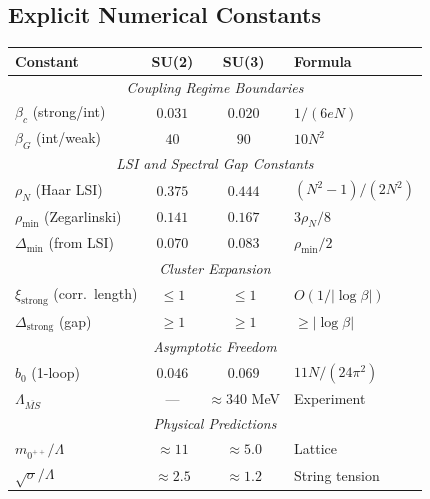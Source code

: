 \subsection{Explicit Numerical Constants}

\begin{tcolorbox}[colback=gray!5,colframe=gray!60!black,title=\textbf{Complete Table of Constants}]
\begin{center}
\renewcommand{\arraystretch}{1.5}
\begin{tabular}{|l|c|c|l|}
\hline
\textbf{Constant} & \textbf{SU(2)} & \textbf{SU(3)} & \textbf{Formula} \\
\hline
\hline
\multicolumn{4}{|c|}{\textit{Coupling Regime Boundaries}} \\
\hline
$\beta_c$ (strong/int) & $0.031$ & $0.020$ & $1/(6eN)$ \\
$\beta_G$ (int/weak) & $40$ & $90$ & $10N^2$ \\
\hline
\hline
\multicolumn{4}{|c|}{\textit{LSI and Spectral Gap Constants}} \\
\hline
$\rho_N$ (Haar LSI) & $0.375$ & $0.444$ & $(N^2-1)/(2N^2)$ \\
$\rho_{\min}$ (Zegarlinski) & $0.141$ & $0.167$ & $3\rho_N/8$ \\
$\Delta_{\min}$ (from LSI) & $0.070$ & $0.083$ & $\rho_{\min}/2$ \\
\hline
\hline
\multicolumn{4}{|c|}{\textit{Cluster Expansion}} \\
\hline
$\xi_{\text{strong}}$ (corr.\ length) & $\leq 1$ & $\leq 1$ & $O(1/|\log\beta|)$ \\
$\Delta_{\text{strong}}$ (gap) & $\geq 1$ & $\geq 1$ & $\geq |\log\beta|$ \\
\hline
\hline
\multicolumn{4}{|c|}{\textit{Asymptotic Freedom}} \\
\hline
$b_0$ (1-loop) & $0.046$ & $0.069$ & $11N/(24\pi^2)$ \\
$\Lambda_{\overline{MS}}$ & --- & $\approx 340$ MeV & Experiment \\
\hline
\hline
\multicolumn{4}{|c|}{\textit{Physical Predictions}} \\
\hline
$m_{0^{++}}/\Lambda$ & $\approx 11$ & $\approx 5.0$ & Lattice \\
$\sqrt{\sigma}/\Lambda$ & $\approx 2.5$ & $\approx 1.2$ & String tension \\
\hline
\end{tabular}
\end{center}
\end{tcolorbox}

